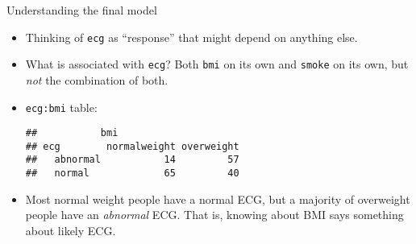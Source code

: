 \begin{frame}[fragile]{Understanding the final model}
  
  \begin{itemize}
  \item Thinking of \texttt{ecg} as ``response'' that might depend on
    anything else.
  \item What is associated with \texttt{ecg}? Both \texttt{bmi} on its
    own and \texttt{smoke} on its own, but \emph{not} the combination
    of both.
  \item \texttt{ecg:bmi} table:
\begin{knitrout}
\color{fgcolor}\begin{kframe}
\begin{alltt}
\hlopt{~}\hlopt{+}
\end{alltt}
\begin{verbatim}
##           bmi
## ecg        normalweight overweight
##   abnormal           14         57
##   normal             65         40
\end{verbatim}
\end{kframe}
\end{knitrout}

\item Most normal weight people have a normal ECG, but a
  majority of overweight people have an \emph{abnormal} ECG. That is,
  knowing about BMI says something about likely ECG.

  \end{itemize}
  
\end{frame}

